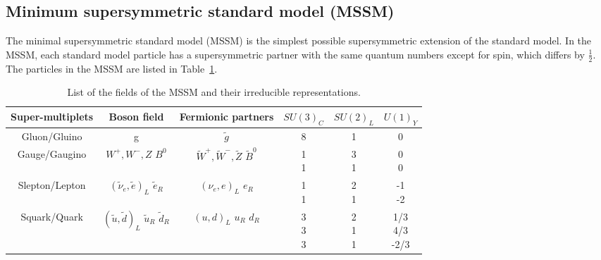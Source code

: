 \subsection{Minimum supersymmetric standard model (MSSM)}

The minimal supersymmetric standard model (MSSM) is the simplest possible supersymmetric extension of the standard model. In the MSSM, each standard model particle has a supersymmetric partner with the same quantum numbers except for spin, which differs by $\frac{1}{2}$. The particles in the MSSM are listed in Table~\ref{tab:c2mssmf}.

\begin{table}[htbp]
\fontsize{10 pt}{1.2 em}
\selectfont
\begin{centering}
\caption{\label{tab:c2mssmf}List of the fields of the MSSM and their irreducible representations.}
\hspace*{-4ex}
\begin{tabular}{|c|c|c|c|c|c|}
\hline
Super-multiplets & Boson field & Fermionic partners & $SU(3)_{C}$ & $SU(2)_{L}$ & $U(1)_{Y}$ \\
\hline
Gluon/Gluino     & g & $\tilde{g}$ & 8 & 1 & 0 \\
\hline
Gauge/Gaugino    & \specialcell{$W^{+},W^{-},Z$ \\ $B^{0}$} & \specialcell{$\tilde{W}^{+},\tilde{W}^{-},\tilde{Z}$ \\ $\tilde{B}^{0}$} & \specialcell{1 \\ 1} & \specialcell{3 \\ 1} & \specialcell{0 \\ 0} \\
\hline
Slepton/Lepton   & \specialcell{$(\tilde{\nu}_{e},\tilde{e})_{L}$ \\ $\tilde{e}_{R}$} & \specialcell{$(\nu_{e},e)_{L}$ \\ $e_{R}$} & \specialcell{1 \\ 1} & \specialcell{2 \\ 1} & \specialcell{-1 \\ -2} \\
\hline
Squark/Quark     & \specialcell{$(\tilde{u},\tilde{d})_{L}$ \\ $\tilde{u}_{R}$ \\ $\tilde{d}_{R}$} & \specialcell{$(u,d)_{L}$ \\ $u_{R}$ \\ $d_{R}$} & \specialcell{3 \\ 3 \\ 3} & \specialcell{2 \\ 1 \\ 1} & \specialcell{1/3 \\ 4/3 \\ -2/3} \\

\end{tabular}
\end{centering}
\end{table}
